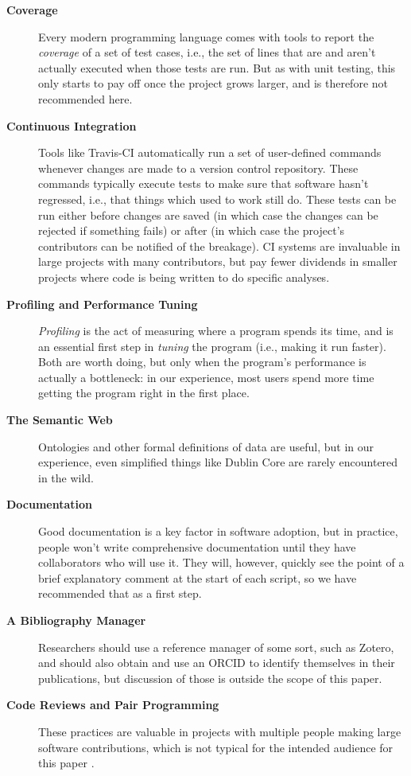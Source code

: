 \documentclass[10pt,letterpaper]{article}
\newcommand{\withurl}[2]{{#1}}
\begin{document}
\begin{description}
  \item[\textbf{Coverage}] Every modern programming language comes with
    tools to report the \emph{coverage} of a set of test cases, i.e.,
    the set of lines that are and aren't actually executed when those
    tests are run. But as with unit testing, this only starts to pay off
    once the project grows larger, and is therefore not recommended
    here.

\item[\textbf{Continuous Integration}] Tools like
  \withurl{Travis-CI}{https://travis-ci.org/} automatically run a set
  of user-defined commands whenever changes are made to a version
  control repository. These commands typically execute tests to make
  sure that software hasn't regressed, i.e., that things which used to
  work still do. These tests can be run either before changes are
  saved (in which case the changes can be rejected if something fails)
  or after (in which case the project's contributors can be notified
  of the breakage). CI systems are invaluable in large projects with
  many contributors, but pay fewer dividends in smaller projects where
  code is being written to do specific analyses.

\item[\textbf{Profiling and Performance Tuning}] \emph{Profiling} is
  the act of measuring where a program spends its time, and is an
  essential first step in \emph{tuning} the program (i.e., making it
  run faster). Both are worth doing, but only when the program's
  performance is actually a bottleneck: in our experience, most users
  spend more time getting the program right in the first place.

\item[\textbf{The Semantic Web}] Ontologies and other formal
  definitions of data are useful, but in our experience, even
  simplified things like \withurl{Dublin Core}{http://dublincore.org/}
  are rarely encountered in the wild.

\item[\textbf{Documentation}] Good documentation is a key factor in
  software adoption, but in practice, people won't write comprehensive
  documentation until they have collaborators who will use it. They
  will, however, quickly see the point of a brief explanatory comment
  at the start of each script, so we have recommended that as a first
  step.

\item[\textbf{A Bibliography Manager}] Researchers should use a
  reference manager of some sort, such as
  \withurl{Zotero}{http://zotero.org/}, and should also obtain and use
  an \withurl{ORCID}{http://orcid.org/} to identify themselves in
  their publications, but discussion of those is outside the scope of
  this paper.

\item[\textbf{Code Reviews and Pair Programming}] These practices are
  valuable in projects with multiple people making large software
  contributions, which is not typical for the intended audience for
  this paper \cite{petre2014}.

\end{description}
\end{document}
